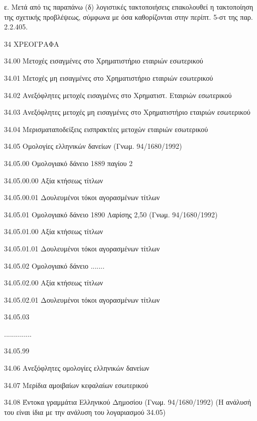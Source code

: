 \documentclass[A4,10pt,greek]{book}
\begin{document}
ε. Μετά από τις παραπάνω (δ) λογιστικές τακτοποιήσεις επακολουθεί η τακτοποίηση της σχετικής προβλέψεως, σύμφωνα με όσα καθορίζονται στην περίπτ. 5-στ της παρ.  2.2.405.

 34   ΧΡΕΟΓΡΑΦΑ

        34.00   Μετοχές εισαγμένες στο Χρηματιστήριο εταιριών εσωτερικού

        34.01   Μετοχές μη εισαγμένες στο Χρηματιστήριο εταιριών εσωτερικού

        34.02   Ανεξόφλητες μετοχές εισαγμένες στο Χρηματιστ. Εταιριών
                    εσωτερικού

        34.03   Ανεξόφλητες μετοχές μη εισαγμένες στο Χρηματιστήριο εταιριών
                     εσωτερικού

        34.04   Μερισματαποδείξεις εισπρακτέες μετοχών εταιριών εσωτερικού

        34.05   Ομολογίες ελληνικών δανείων (Γνωμ. 94/1680/1992)

                    34.05.00   Ομολογιακό δάνειο 1889 παγίου 2%

                                      34.05.00.00   Αξία κτήσεως τίτλων

                                      34.05.00.01   Δουλευμένοι τόκοι αγορασμένων τίτλων

                    34.05.01   Ομολογιακό δάνειο 1890 Λαρίσης 2,50%
                                      (Γνωμ. 94/1680/1992)

                                      34.05.01.00    Αξία κτήσεως τίτλων

                                      34.05.01.01    Δουλευμένοι τόκοι αγορασμένων τίτλων

                    34.05.02   Ομολογιακό δάνειο .......

                                      34.05.02.00   Αξία κτήσεως τίτλων

                                      34.05.02.01   Δουλευμένοι τόκοι αγορασμένων τίτλων

                    34.05.03

                    ..............

                    34.05.99

        34.06   Ανεξόφλητες ομολογίες ελληνικών δανείων

        34.07   Μερίδια αμοιβαίων κεφαλαίων εσωτερικού

        34.08    Έντοκα γραμμάτια Ελληνικού Δημοσίου (Γνωμ. 94/1680/1992)
                    (Η ανάλυσή του είναι ίδια με την ανάλυση του λογαριασμού 34.05)
\end{document}
